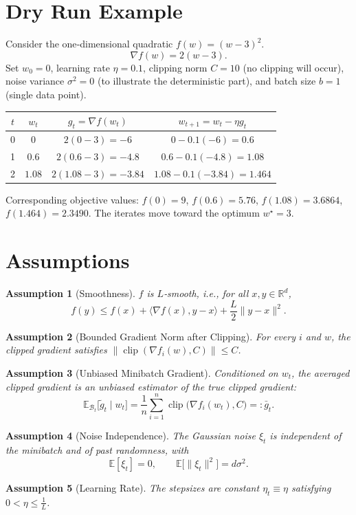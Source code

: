 \documentclass{article}
\newcommand{\E}{\mathbb{E}}
\newcommand{\R}{\mathbb{R}}
\newtheorem{assumption}{Assumption}
\begin{document}
\section*{Dry Run Example}
Consider the one‑dimensional quadratic $f(w)=(w-3)^2$.
\[
\nabla f(w)=2(w-3).
\]
Set $w_0=0$, learning rate $\eta=0.1$, clipping norm $C=10$ (no clipping will occur), noise variance $\sigma^2=0$ (to illustrate the deterministic part), and batch size $b=1$ (single data point).  

\begin{center}
\begin{tabular}{c|c|c|c}
$t$ & $w_t$ & $g_t=\nabla f(w_t)$ & $w_{t+1}=w_t-\eta g_t$\\ \hline
0 & $0$ & $2(0-3)=-6$ & $0-0.1(-6)=0.6$\\
1 & $0.6$ & $2(0.6-3)=-4.8$ & $0.6-0.1(-4.8)=1.08$\\
2 & $1.08$ & $2(1.08-3)=-3.84$ & $1.08-0.1(-3.84)=1.464$\\
\end{tabular}
\end{center}
Corresponding objective values:
$f(0)=9$, $f(0.6)=5.76$, $f(1.08)=3.6864$, $f(1.464)=2.3490$.
The iterates move toward the optimum $w^\star=3$.

\newpage
\section*{Assumptions}
\begin{assumption}[Smoothness]\label{ass:smooth}
$f$ is $L$‑smooth, i.e., for all $x,y\in\R^{d}$,
\[
f(y)\le f(x)+\langle\nabla f(x),y-x\rangle+\frac{L}{2}\|y-x\|^{2}.
\]
\end{assumption}
\begin{assumption}[Bounded Gradient Norm after Clipping]\label{ass:clip}
For every $i$ and $w$, the clipped gradient satisfies $\|\operatorname{clip}(\nabla f_i(w),C)\|\le C$.
\end{assumption}
\begin{assumption}[Unbiased Minibatch Gradient]\label{ass:unbiased}
Conditioned on $w_t$, the averaged clipped gradient is an unbiased estimator of the true clipped gradient:
\[
\E_{\mathcal{B}_t}\bigl[\tilde g_t\mid w_t\bigr]=\frac{1}{n}\sum_{i=1}^{n}\operatorname{clip}\!\bigl(\nabla f_i(w_t),C\bigr)=:\bar g_t .
\]
\end{assumption}
\begin{assumption}[Noise Independence]\label{ass:noise}
The Gaussian noise $\xi_t$ is independent of the minibatch and of past randomness, with
\[
\E[\xi_t]=0,\qquad \E\bigl[\|\xi_t\|^{2}\bigr]=d\sigma^{2}.
\]
\end{assumption}
\begin{assumption}[Learning Rate]\label{ass:lr}
The stepsizes are constant $\eta_t\equiv\eta$ satisfying $0<\eta\le \frac{1}{L}$.
\end{assumption}
\end{document}
